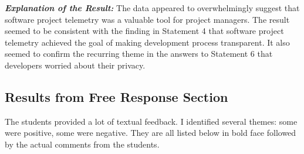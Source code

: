 \textbf{\textit{Explanation of the Result:}}
The data appeared to overwhelmingly suggest that software project telemetry was a valuable tool for project managers. The result seemed to be consistent with the finding in Statement 4 that software project telemetry achieved the goal of making development process transparent. It also seemed to confirm the recurring theme in the answers to Statement 6 that developers worried about their privacy. 






\setlength{\parindent}{6mm} %


\clearpage
\subsection{Results from Free Response Section}

The students provided a lot of textual feedback. I identified several themes: some were positive, some were negative. They are all listed below in bold face followed by the actual comments from the students.

